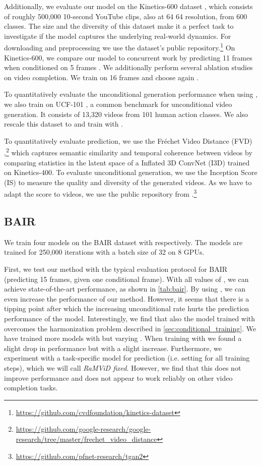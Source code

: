 \documentclass[10pt]{article} \usepackage[accepted]{tmlr}
\begin{document}
Additionally, we evaluate our model on the Kinetics-600 dataset \citep{Carreira_2018}, which consists of roughly 500,000 10-second YouTube clips, also at 64  64 resolution, from 600 classes. The size and the diversity of this dataset make it a perfect task to investigate if the model captures the underlying real-world dynamics. For downloading and preprocessing we use the dataset's public repository.\footnote{\url{https://github.com/cvdfoundation/kinetics-dataset}} On Kinetics-600, we compare our model to concurrent work by predicting 11 frames when conditioned on 5 frames \citep{Luc_2020}. We additionally perform several ablation studies on video completion. We train on 16 frames and choose again .

To quantitatively evaluate the unconditional generation performance when using , we also train on UCF-101 \citep{soomro_2021_ucf}, a common benchmark for unconditional video generation. It consists of 13,320 videos from 101 human action classes. We also rescale this dataset to  and train with .  

To quantitatively evaluate prediction, we use the Fr\'echet Video Distance (FVD) \citep{Unterthiner_2018},\footnote{\url{https://github.com/google-research/google-research/tree/master/frechet_video_distance}} which captures semantic similarity and temporal coherence between videos by comparing statistics in the latent space of a Inflated 3D ConvNet (I3D) trained on Kinetics-400. 
To evaluate unconditional generation, we use the Inception Score (IS) \citep{salimans_improved_2016} to measure the quality and diversity of the generated videos. As we have to adapt the score to videos, we use the public repository from \citet{Saito_2020}.\footnote{\url{https://github.com/pfnet-research/tgan2}}


\subsection{BAIR}
We train four models on the BAIR dataset with  respectively. The models are trained for 250,000 iterations with a batch size of 32 on 8 GPUs. 

First, we test our method with the typical evaluation protocol for BAIR (predicting 15 frames, given one conditional frame). With all values of , we can achieve state-of-the-art performance, as shown in \cref{tab:bair}. By using , we can even increase the performance of our method. However, it seems that there is a tipping point after which the increasing unconditional rate hurts the prediction performance of the model. Interestingly, we find that also the model trained with  overcomes the harmonization problem described in \cref{sec:conditional_training}. We have trained more models with  but varying . When training with  we found a slight drop in performance but with  a slight increase.
Furthermore, we experiment with a task-specific model for prediction (i.e. setting  for all training steps), which we will call \emph{RaMViD fixed}. However, we find that this does not improve performance and does not appear to work reliably on other video completion tasks.
\end{document}
